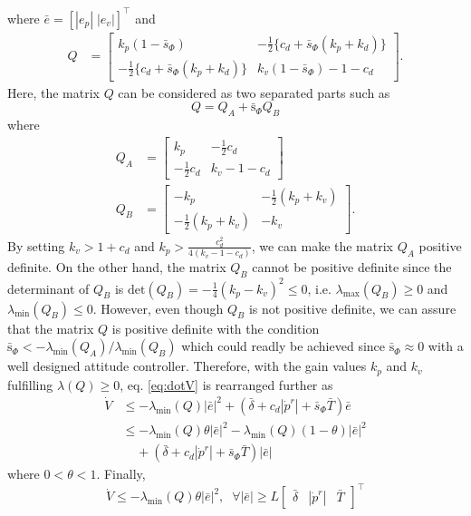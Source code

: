 \documentclass[letterpaper, 10 pt, conference]{ieeeconf}  %
\begin{document}
where $\bar{e} = [|e_p|\;|e_v|]^\top$ and
\begin{align}
Q &= \left[
\begin{array}{rr}
k_p(1-\bar{s}_\Phi) & -\frac{1}{2}\{c_d+\bar{s}_\Phi(k_p+k_d)\} \\
-\frac{1}{2}\{c_d+\bar{s}_\Phi(k_p+k_d)\} & k_v(1-\bar{s}_\Phi)-1-c_d
\end{array}
\right].\nonumber 
\end{align}
Here, the matrix $Q$ can be considered as two separated parts such as
\begin{equation}
Q = Q_A + \bar{\text{s}}_\Phi Q_B \nonumber
\end{equation}
where
\begin{align}
Q_A &= \left[
\begin{array}{rr}
k_p & -\frac{1}{2}c_d \\ -\frac{1}{2}c_d & k_v-1-c_d
\end{array}
\right] \nonumber \\
Q_B &= \left[
\begin{array}{rr}
-k_p & -\frac{1}{2}(k_p+k_v) \\ -\frac{1}{2}(k_p+k_v) & -k_v
\end{array}
\right].
\end{align}
By setting $k_v > 1+c_d$ and $k_p > \frac{c_d^2}{4(k_v-1-c_d)}$, we can make the matrix $Q_A$ positive definite. 
On the other hand, the matrix $Q_B$ cannot be positive definite since the determinant of $Q_B$ is $\text{det}(Q_B) = -\frac{1}{4}(k_p-k_v)^2 \leq 0$, i.e. $\lambda_{\max}(Q_B)\geq0$ and $\lambda_{\min}(Q_B)\leq 0$.
However, even though $Q_B$ is not positive definite, we can assure that the matrix $Q$ is positive definite with the condition $\bar{\text{s}}_\Phi < -\lambda_{\min}(Q_A)/\lambda_{\min}(Q_B)$
which could readly be achieved since $\bar{\text{s}}_\Phi \approx 0$ with a well designed attitude controller.
Therefore, with the gain values $k_p$ and $k_v$ fulfilling $\lambda(Q) \geq 0$, eq. \eqref{eq:dotV} is rearranged further as
\begin{align}
\dot{V} &\leq -\lambda_{\min}(Q)|\bar{e}|^2 + (\bar{\delta}+c_d|\dot{p}^r|+\bar{s}_\Phi\bar{T})\bar{e} \nonumber \\
&\leq -\lambda_{\min}(Q)\theta|\bar{e}|^2-\lambda_{\min}(Q)(1-\theta)|\bar{e}|^2 \nonumber \\
&\;\;\;\;+ (\bar{\delta}+c_d|\dot{p}^r|+\bar{s}_\Phi\bar{T})|\bar{e}| \nonumber
\end{align}
where $0<\theta<1$. Finally, 
\begin{equation}
\dot{V} \leq -\lambda_{\min}(Q)\theta|\bar{e}|^2,\;\;\forall|\bar{e}| \geq L\left[
\begin{array}{ccc}
\bar{\delta}&|\dot{p}^r|&\bar{T}
\end{array}
\right]^\top
\end{equation}
\end{document}
